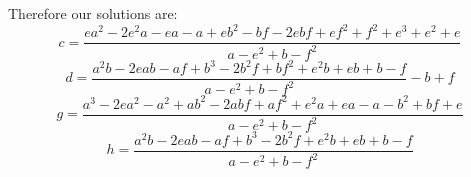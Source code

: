 \documentclass[12pt]{amsart}
\begin{document}
Therefore our solutions are: 
$$c = \frac{ea^2 - 2e^2a -ea -a + eb^2 -bf -2ebf + ef^2 + f^2 + e^3 + e^2 + e} {a-e^2+b-f^2}$$ 
$$d = \frac{a^2b - 2eab -af +b^3 -2b^2f + bf^2 + e^2b + eb + b - f}{a-e^2 + b -f^2} -b + f$$ 
$$g = \frac{a^3 -2ea^2 - a^2 + ab^2 - 2abf + af^2 + e^2a + ea - a -b^2 + bf + e} {a-e^2+b-f^2}$$ $$h = \frac{a^2b - 2eab -af + b^3 - 2b^2f + e^2b + eb +b -f} {a-e^2+b-f^2}$$
\end{document}
